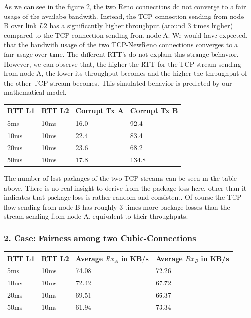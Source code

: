 As we can see in the figure 2, the two Reno connections do not converge to a fair usage of the availabe bandwith. Instead, the TCP connection sending from node B over link $L2$ has a significantly higher throughput (around 3 times higher) compared to the TCP connection sending from node A. We would have expected, that the bandwith usage of the two TCP-NewReno connections converges to a fair usage over time. The different RTT's do not explain this strange behavior. However, we can observe that, the higher the RTT for the TCP stream sending from node A, the lower its throughput becomes and the higher the throughput of the other TCP stream becomes. This simulated behavior is predicted by our mathematical model.
\begin{table}[H]
\centering
\begin{tabular}{|l|l|l|l|}
\hline
\textbf{RTT L1} & \textbf{RTT L2} & \textbf{Corrupt Tx A} & \textbf{Corrupt Tx B} \\ \hline
5ms             & 10ms            &        16.0              &         92.4              \\ \hline
10ms            & 10ms            &         22.4              &        83.4               \\ \hline
20ms            & 10ms            &       23.6                &         68.2              \\ \hline
50ms            & 10ms            &       17.8                &         134.8              \\ \hline
\end{tabular}
\end{table}
The number of lost packages of the two TCP streams can be seen in the table above. There is no real insight to derive from the package loss here, other than it indicates that package loss is rather random and consistent. Of course the TCP flow sending from node B has roughly 3 times more package losses than the stream sending from node A, equivalent to their throughputs.

\subsubsection*{2. Case: Fairness among two Cubic-Connections}

\begin{table}[H]
\centering
\begin{tabular}{|l|l|l|l|}
\hline
\textbf{RTT L1} & \textbf{RTT L2} & \textbf{Average $Rx_A$ in KB/s} & \textbf{Average $Rx_B$ in KB/s} \\ \hline
5ms             & 10ms            &          74.08               &         72.26                \\ \hline
10ms            & 10ms            &         72.42                &           67.72              \\ \hline
20ms            & 10ms            &         69.51                &         66.37                \\ \hline
50ms            & 10ms            &          61.94               &           73.34              \\ \hline
\end{tabular}
\end{table}


